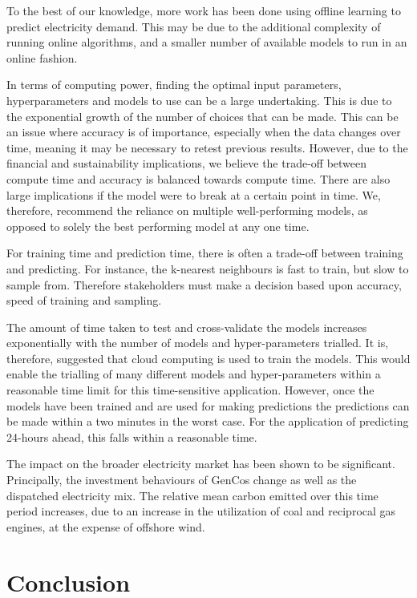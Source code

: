 \documentclass[final,3p,times,twocolumn,numbers]{elsarticle}
\begin{document}
To the best of our knowledge, more work has been done using offline learning to predict electricity demand. This may be due to the additional complexity of running online algorithms, and a smaller number of available models to run in an online fashion.

In terms of computing power, finding the optimal input parameters, hyperparameters and models to use can be a large undertaking. This is due to the exponential growth of the number of choices that can be made. This can be an issue where accuracy is of importance, especially when the data changes over time, meaning it may be necessary to retest previous results. However, due to the financial and sustainability implications, we believe the trade-off between compute time and accuracy is balanced towards compute time. There are also large implications if the model were to break at a certain point in time. We, therefore, recommend the reliance on multiple well-performing models, as opposed to solely the best performing model at any one time. 

For training time and prediction time, there is often a trade-off between training and predicting. For instance, the k-nearest neighbours is fast to train, but slow to sample from. Therefore stakeholders must make a decision based upon accuracy, speed of training and sampling. 

The amount of time taken to test and cross-validate the models increases exponentially with the number of models and hyper-parameters trialled. It is, therefore, suggested that cloud computing is used to train the models. This would enable the trialling of many different models and hyper-parameters within a reasonable time limit for this time-sensitive application. However, once the models have been trained and are used for making predictions the predictions can be made within a two minutes in the worst case. For the application of predicting 24-hours ahead, this falls within a reasonable time.

The impact on the broader electricity market has been shown to be significant. Principally, the investment behaviours of GenCos change as well as the dispatched electricity mix. The relative mean carbon emitted over this time period increases, due to an increase in the utilization of coal and reciprocal gas engines, at the expense of offshore wind.




\section{Conclusion}
\label{sec:conclusion}
\end{document}
